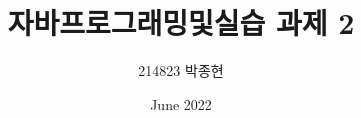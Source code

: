 \documentclass{article}
\title{자바프로그래밍및실습 과제 2}
\author{214823 박종현}
\date{June 2022}
\begin{document}
\maketitle
\pagebreak
\end{document}
